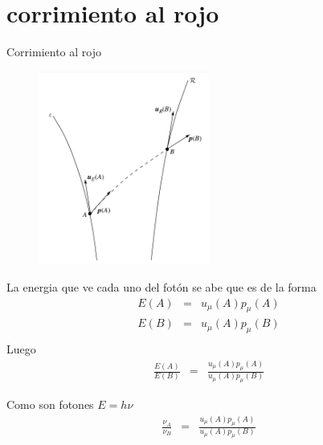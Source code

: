 \documentclass[xcolor=dvipsnames]{beamer}
\begin{document}
\section{corrimiento al rojo}
\begin{frame}{Corrimiento al rojo}
    \begin{figure}
        \centering
        \includegraphics[width=0.5\textwidth]{Presentations/Images/3_foton_redshift.png}
    \end{figure}
\end{frame}



\begin{frame}{}
    \begin{block}{}
    La energia que ve cada uno del fotón se abe que es de la forma
    \begin{eqnarray*}
          E(A)&=&u_{\mu}(A)p_{\mu}(A)\\
          E(B)&=&u_{\mu}(A)p_{\mu}(B)\\
    \end{eqnarray*}
    Luego
    \begin{eqnarray*}
         \frac{E(A)}{E(B)} &=&\frac{u_{\mu}(A)p_{\mu}(A)}{u_{\mu}(A)p_{\mu}(B)}
    \end{eqnarray*}
    
    \end{block}
     
     \begin{block}{}
     Como son fotones $E=h\nu$
     \begin{eqnarray*}
         \frac{\nu_{A}}{\nu_{B}} &=&\frac{u_{\mu}(A)p_{\mu}(A)}{u_{\mu}(A)p_{\mu}(B)}
    \end{eqnarray*}
    
     \end{block}
         
    \end{frame}
 
\end{document}
